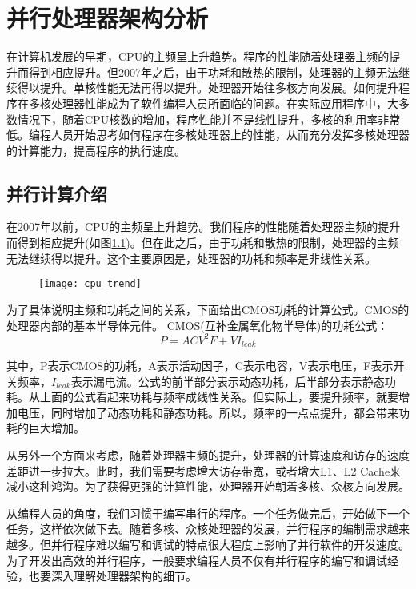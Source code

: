 \chapter{并行处理器架构分析}\label{chap:parallelArch}
在计算机发展的早期，CPU的主频呈上升趋势。程序的性能随着处理器主频的提升而得到相应提升。但2007年之后，由于功耗和散热的限制，处理器的主频无法继续得以提升。单核性能无法再得以提升。处理器开始往多核方向发展。如何提升程序在多核处理器性能成为了软件编程人员所面临的问题。在实际应用程序中，大多数情况下，随着CPU核数的增加，程序性能并不是线性提升，多核的利用率非常低。编程人员开始思考如何程序在多核处理器上的性能，从而充分发挥多核处理器的计算能力，提高程序的执行速度。

\section{并行计算介绍}
在2007年以前，CPU的主频呈上升趋势。我们程序的性能随着处理器主频的提升而得到相应提升(如图\ref{fig:cpu_trend})。但在此之后，由于功耗和散热的限制，处理器的主频无法继续得以提升。这个主要原因是，处理器的功耗和频率是非线性关系。
\begin{figure}[htbp]
	\centering
	\texttt{[image: cpu\_trend]}
	\label{fig:cpu_trend}
\end{figure}
为了具体说明主频和功耗之间的关系，下面给出CMOS功耗的计算公式。CMOS的处理器内部的基本半导体元件。
CMOS(互补金属氧化物半导体)的功耗公式：
\begin{equation}
	\label{eq:power}
	P=ACV^{2}F+VI_{leak}
\end{equation}

其中，P表示CMOS的功耗，A表示活动因子，C表示电容，V表示电压，F表示开关频率，$I_{leak}$表示漏电流。公式的前半部分表示动态功耗，后半部分表示静态功耗。从上面的公式看起来功耗与频率成线性关系。但实际上，要提升频率，就要增加电压，同时增加了动态功耗和静态功耗。所以，频率的一点点提升，都会带来功耗的巨大增加。

从另外一个方面来考虑，随着处理器主频的提升，处理器的计算速度和访存的速度差距进一步拉大。此时，我们需要考虑增大访存带宽，或者增大L1、L2 Cache来减小这种鸿沟。为了获得更强的计算性能，处理器开始朝着多核、众核方向发展。

从编程人员的角度，我们习惯于编写串行的程序。一个任务做完后，开始做下一个任务，这样依次做下去。随着多核、众核处理器的发展，并行程序的编制需求越来越多。但并行程序难以编写和调试的特点很大程度上影响了并行软件的开发速度。为了开发出高效的并行程序，一般要求编程人员不仅有并行程序的编写和调试经验，也要深入理解处理器架构的细节。

